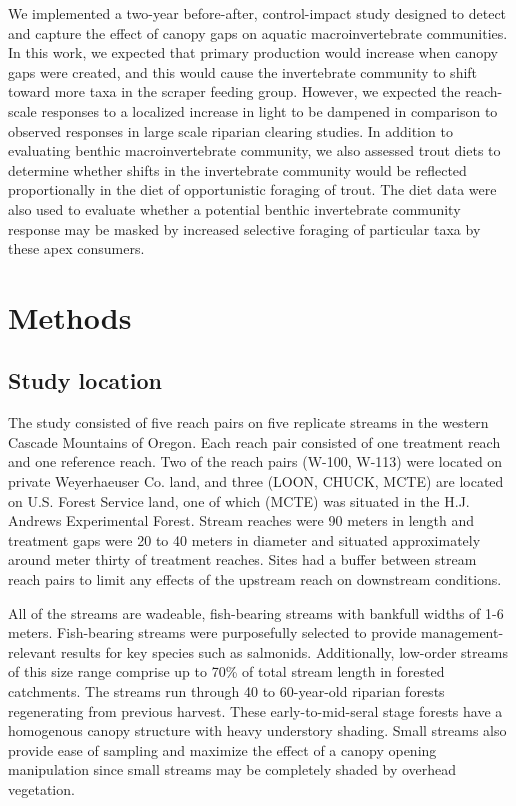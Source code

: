 \documentclass[double,12pt]{beavtex}
\begin{document}
  We implemented a two-year before-after, control-impact study designed to
  detect and capture the effect of canopy gaps on aquatic
  macroinvertebrate communities. In this work, we expected that primary
  production would increase when canopy gaps were created, and this would
  cause the invertebrate community to shift toward more taxa in the
  scraper feeding group. However, we expected the reach-scale responses to
  a localized increase in light to be dampened in comparison to observed
  responses in large scale riparian clearing studies. In addition to
  evaluating benthic macroinvertebrate community, we also assessed trout
  diets to determine whether shifts in the invertebrate community would be
  reflected proportionally in the diet of opportunistic foraging of trout.
  The diet data were also used to evaluate whether a potential benthic
  invertebrate community response may be masked by increased selective
  foraging of particular taxa by these apex consumers.
  
  \chapter*{Methods}\label{methods}
  
  \section*{Study location}\label{study-location}
  
  The study consisted of five reach pairs on five replicate streams in the
  western Cascade Mountains of Oregon. Each reach pair consisted of one
  treatment reach and one reference reach. Two of the reach pairs (W-100,
  W-113) were located on private Weyerhaeuser Co. land, and three (LOON,
  CHUCK, MCTE) are located on U.S. Forest Service land, one of which
  (MCTE) was situated in the H.J. Andrews Experimental Forest. Stream
  reaches were 90 meters in length and treatment gaps were 20 to 40 meters
  in diameter and situated approximately around meter thirty of treatment
  reaches. Sites had a buffer between stream reach pairs to limit any
  effects of the upstream reach on downstream conditions.
  
  All of the streams are wadeable, fish-bearing streams with bankfull
  widths of 1-6 meters. Fish-bearing streams were purposefully selected to
  provide management-relevant results for key species such as salmonids.
  Additionally, low-order streams of this size range comprise up to 70\%
  of total stream length in forested catchments. The streams run through
  40 to 60-year-old riparian forests regenerating from previous harvest.
  These early-to-mid-seral stage forests have a homogenous canopy
  structure with heavy understory shading. Small streams also provide ease
  of sampling and maximize the effect of a canopy opening manipulation
  since small streams may be completely shaded by overhead vegetation.
  
\end{document}
